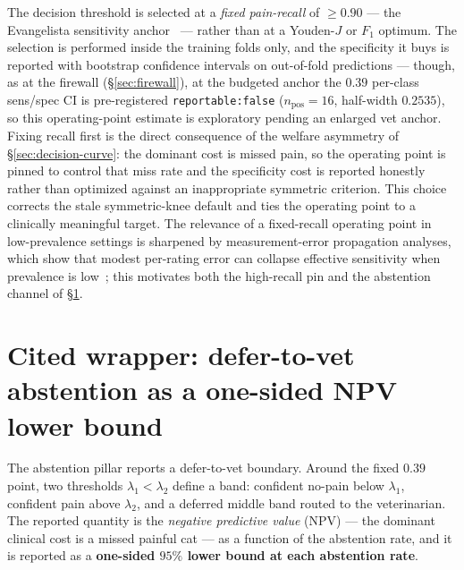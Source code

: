 The decision threshold is selected at a \emph{fixed pain-recall} of
$\geq 0.90$ --- the Evangelista sensitivity anchor~\cite{evangelista2019} ---
rather than at a Youden-$J$ or $F_1$ optimum. The selection is performed inside
the training folds only, and the specificity it buys is reported with bootstrap
confidence intervals on out-of-fold predictions --- though, as at the firewall
(\S\ref{sec:firewall}), at the budgeted anchor the $0.39$ per-class sens/spec CI
is pre-registered \texttt{reportable:false} ($n_{\text{pos}}=16$, half-width
$0.2535$), so this operating-point estimate is exploratory pending an enlarged
vet anchor. Fixing recall first is the
direct consequence of the welfare asymmetry of \S\ref{sec:decision-curve}: the
dominant cost is missed pain, so the operating point is pinned to control that
miss rate and the specificity cost is reported honestly rather than optimized
against an inappropriate symmetric criterion. This choice corrects the stale
symmetric-knee default and ties the operating point to a clinically meaningful
target. The relevance of a fixed-recall operating point in low-prevalence
settings is sharpened by measurement-error propagation analyses, which show that
modest per-rating error can collapse effective sensitivity when prevalence is
low~\cite{chavoshi2025}; this motivates both the high-recall pin and the
abstention channel of \S\ref{sec:abstention}.

\section{Cited wrapper: defer-to-vet abstention as a one-sided NPV lower bound}
\label{sec:abstention}

The abstention pillar reports a defer-to-vet boundary. Around the fixed $0.39$
point, two thresholds $\lambda_1 < \lambda_2$ define a band: confident
no-pain below $\lambda_1$, confident pain above $\lambda_2$, and a deferred
middle band routed to the veterinarian. The reported quantity is the
\emph{negative predictive value} (NPV) --- the dominant clinical cost is a
missed painful cat --- as a function of the abstention rate, and it is reported
as a \textbf{one-sided $95\%$ lower bound at each abstention rate}.

